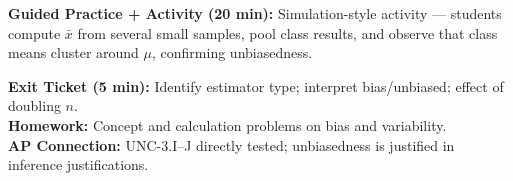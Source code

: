 \documentclass[10pt]{article}
\begin{document}
\begin{practicebox}
\textbf{Guided Practice + Activity (20 min):} Simulation-style activity — students compute $\bar{x}$ from several small samples, pool class results, and observe that class means cluster around $\mu$, confirming unbiasedness.
\end{practicebox}

\begin{reflectionbox}
\textbf{Exit Ticket (5 min):} Identify estimator type; interpret bias/unbiased; effect of doubling $n$.\\
\textbf{Homework:} Concept and calculation problems on bias and variability.\\
\textbf{AP Connection:} UNC-3.I--J directly tested; unbiasedness is justified in inference justifications.
\end{reflectionbox}
\end{document}
